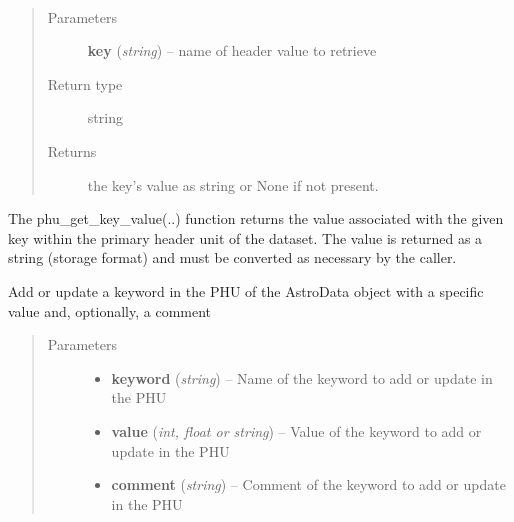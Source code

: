 \documentclass[letterpaper,10pt,english]{sphinxmanual}
\begin{document}
\begin{fulllineitems}
\label{chapter_AstroDataClass:astrodata.data.AstroData.phu_get_key_value}~\begin{quote}\begin{description}
\item[{Parameters}] \leavevmode
\textbf{key} (\emph{string}) -- name of header value to retrieve

\item[{Return type}] \leavevmode
string

\item[{Returns}] \leavevmode
the key's value as string or None if not present.

\end{description}\end{quote}

The phu\_get\_key\_value(..) function returns the value associated with the
given key within the primary header unit
of the dataset. The value is returned as a string (storage format)
and must be converted as necessary by the caller.

\end{fulllineitems}


\begin{fulllineitems}
\label{chapter_AstroDataClass:astrodata.data.AstroData.phu_set_key_value}
Add or update a keyword in the PHU of the AstroData object with a
specific value and, optionally, a comment
\begin{quote}\begin{description}
\item[{Parameters}] \leavevmode\begin{itemize}
\item {} 
\textbf{keyword} (\emph{string}) -- Name of the keyword to add or update in the PHU

\item {} 
\textbf{value} (\emph{int, float or string}) -- Value of the keyword to add or update in the PHU

\item {} 
\textbf{comment} (\emph{string}) -- Comment of the keyword to add or update in the PHU

\end{itemize}

\end{description}\end{quote}

\end{fulllineitems}
\end{document}
